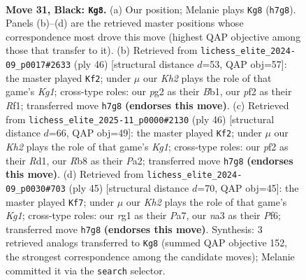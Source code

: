 \documentclass[11pt]{article}
\begin{document}
\clearpage

\begin{figure}[p]\centering
\begin{subfigure}{0.46\textwidth}\centering
\resizebox{\linewidth}{!}{%
\newchessgame
\chessboard[
  setfen={1r3r2/p4p1k/bpB1p1pp/2n5/2P5/N1B1P2P/PR2KPP1/6R1 b - - 8 31},
  showmover=false,
  pgfstyle=straightmove, color=movearrow, markmove={h7-g8}
]}
\caption{}
\end{subfigure}\hfill
\begin{subfigure}{0.46\textwidth}\centering
\resizebox{\linewidth}{!}{%
\newchessgame
\chessboard[
  setfen={5rk1/p2r2pp/1pn5/1Np2b2/P1P5/3P1P2/6PP/RB3RK1 w - - 0 24},
  showmover=false,
  pgfstyle=straightmove, color=movearrow, markmove={g1-f2}
]}
\caption{}
\end{subfigure}
\\[4pt]
\begin{subfigure}{0.46\textwidth}\centering
\resizebox{\linewidth}{!}{%
\newchessgame
\chessboard[
  setfen={3r1k2/1br2ppp/2p1p3/ppP5/3P1P2/3R2P1/PP4BP/3R2K1 w - - 1 24},
  showmover=false,
  pgfstyle=straightmove, color=movearrow, markmove={g1-f2}
]}
\caption{}
\end{subfigure}\hfill
\begin{subfigure}{0.46\textwidth}\centering
\resizebox{\linewidth}{!}{%
\newchessgame
\chessboard[
  setfen={3r1rk1/p6p/3p1pp1/2p1n3/8/1P2B1P1/P2RPPKP/R7 b - - 1 23},
  showmover=false,
  pgfstyle=straightmove, color=movearrow, markmove={g8-f7}
]}
\caption{}
\end{subfigure}
\caption{\textbf{Move 31, Black: \texttt{Kg8}.} (a) Our position; Melanie plays \texttt{Kg8} (\texttt{h7g8}). Panels (b)--(d) are the retrieved master positions whose correspondence most drove this move (highest QAP objective among those that transfer to it). (b) Retrieved from \texttt{lichess\_elite\_2024-09\_p0017\#2633} (ply 46) [structural distance $d$=53, QAP obj=57]: the master played \texttt{Kf2}; under $\mu$ our \emph{Kh2} plays the role of that game's \emph{Kg1}; cross-type roles: our \emph{p}g2 as their \emph{B}b1, our \emph{p}f2 as their \emph{R}f1; transferred move \texttt{h7g8} \textbf{(endorses this move)}. (c) Retrieved from \texttt{lichess\_elite\_2025-11\_p0000\#2130} (ply 46) [structural distance $d$=66, QAP obj=49]: the master played \texttt{Kf2}; under $\mu$ our \emph{Kh2} plays the role of that game's \emph{Kg1}; cross-type roles: our \emph{p}f2 as their \emph{R}d1, our \emph{R}b8 as their \emph{P}a2; transferred move \texttt{h7g8} \textbf{(endorses this move)}. (d) Retrieved from \texttt{lichess\_elite\_2024-09\_p0030\#703} (ply 45) [structural distance $d$=70, QAP obj=45]: the master played \texttt{Kf7}; under $\mu$ our \emph{Kh2} plays the role of that game's \emph{Kg1}; cross-type roles: our \emph{r}g1 as their \emph{P}a7, our \emph{n}a3 as their \emph{P}f6; transferred move \texttt{h7g8} \textbf{(endorses this move)}. Synthesis: 3 retrieved analogs transferred to \texttt{Kg8} (summed QAP objective 152, the strongest correspondence among the candidate moves); Melanie committed it via the \texttt{search} selector.}
\label{fig:thought-m61}
\end{figure}
\end{document}
